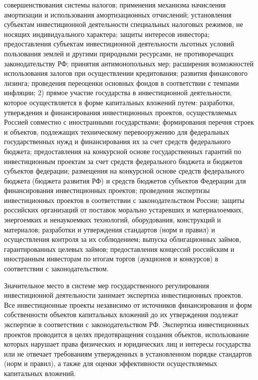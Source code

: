 совершенствования системы налогов;
применения механизма начисления амортизации и использования амортизационных отчислений;
установления субъектам инвестиционной деятельности специальных налоговых режимов, не носящих индивидуального характера;
защиты интересов инвестора;
предоставления субъектам инвестиционной деятельности льготных условий пользования землей и другими природными ресурсами, не противоречащих законодательству РФ;
принятия антимонопольных мер;
расширения возможностей использования залогов при осуществлении кредитования;
развития финансового лизинга;
проведения переоценки основных фондов в соответствии с темпами инфляции;
2) прямое участие государства в инвестиционной деятельности, которое осуществляется в форме капитальных вложений путем: разработки, утверждения и финансирования инвестиционных проектов, осуществляемых Россией совместно с иностранными государствами; формирования перечня строек и объектов, подлежащих техническому перевооружению для федеральных государственных нужд и финансирования их за счет средств федерального бюджета; предоставления на конкурсной основе государственных гарантий по инвестиционным проектам за счет средств федерального бюджета и бюджетов субъектов федерации; размещения на конкурсной основе средств федерального бюджета (бюджета развития РФ) и средств бюджетов субъектов Федерации для финансирования инвестиционных проектов; проведения экспертизы инвестиционных проектов в соответствии с законодательством России; защиты российских организаций от поставок морально устаревших и материалоемких, энергоемких и ненаукоемких технологий, оборудования, конструкций и материалов; разработки и утверждения стандартов (норм и правил) и осуществления контроля за их соблюдением; выпуска облигационных займов, гарантированных целевых займов; предоставления концессий российским и иностранным инвесторам по итогам торгов (аукционов и конкурсов) в соответствии с законодательством.

Значительное место в системе мер государственного регулирования инвестиционной деятельности занимает экспертиза инвестиционных проектов. Все инвестиционные проекты независимо от источников финансирования и форм собственности объектов капитальных вложений до их утверждения подлежат экспертизе в соответствии с законодательством РФ. Экспертиза инвестиционных проектов проводится в целях предотвращения создания объектов, использование которых нарушает права физических и юридических лиц и интересы государства или не отвечает требованиям утвержденных в установленном порядке стандартов (норм и правил), а также для оценки эффективности осуществляемых капитальных вложений.

